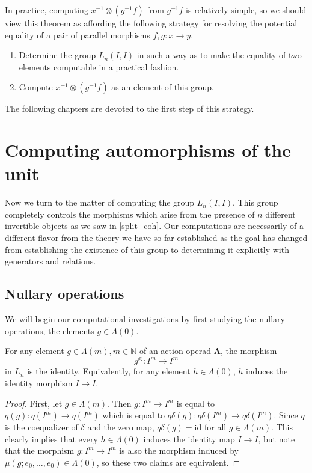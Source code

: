 \documentclass{amsbook} %
\newcommand{\id}{\textrm{id}}
\newcommand{\ML}{\mathbf{\Lambda}}
\numberwithin{section}{chapter}
\begin{document}
In practice, computing $x^{-1} \otimes (g^{-1} f)$ from $g^{-1} f$ is relatively simple, so we should view this theorem as affording the following strategy for resolving the potential equality of a pair of parallel morphisms $f, g \colon x \to y$.
\begin{enumerate}
\item Determine the group $L_n(I,I)$ in such a way as to make the equality of two elements computable in a practical fashion.
\item Compute $x^{-1} \otimes (g^{-1} f)$ as an element of this group.
\end{enumerate}
The following chapters are devoted to the first step of this strategy.

\chapter{Computing automorphisms of the unit}

Now we turn to the matter of computing the group $L_n(I,I)$. This group completely controls the morphisms which arise from the presence of $n$ different invertible objects as we saw in \cref{split_coh}. Our computations are necessarily of a different flavor from the theory we have so far established as the goal has changed from establishing the existence of this group to determining it explicitly with generators and relations.

\section{Nullary operations}
We will begin our computational investigations by first studying the nullary operations, the elements $g \in \Lambda(0)$.

\begin{lem} \label{noscalar} For any element $g \in \Lambda(m), m \in \mathbb{N}$ of an action operad $\ML$, the morphism
\[
g^{\otimes} \colon  I^m \to I^m
\]
in $L_n$ is the identity.
Equivalently, for any element $h \in \Lambda(0)$, $h$ induces the identity morphism $I \to I$.
\end{lem}
\begin{proof}
First, let $g \in \Lambda(m)$. Then $g \colon  I^m \to I^m$ is equal to $q(g) \colon q(I^m) \to q(I^m)$ which is equal to $q\delta(g) \colon  q\delta(I^m) \to q\delta(I^m)$. Since $q$ is the coequalizer of $\delta$ and the zero map, $q\delta(g) = \id$ for all $g \in \Lambda(m)$. This clearly implies that every $h \in \Lambda(0)$ induces the identity map $I \to I$, but note that the morphism $g \colon I^m \to I^m$ is also the morphism induced by $\mu(g; e_0, \ldots, e_0) \in \Lambda(0)$, so these two claims are equivalent.
\end{proof}
\end{document}
